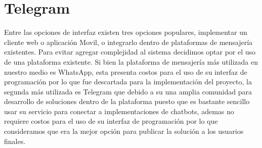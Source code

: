 \section{Telegram}
Entre las opciones de interfaz existen tres opciones populares, implementar un cliente web o
aplicación Movil, o integrarlo dentro de plataformas de mensajería existentes. Para evitar agregar
complejidad al sistema decidimos optar por el uso de una plataforma existente. Si bien la plataforma
de mensajería más utilizada en nuestro medio es WhatsApp, esta presenta
costos para el uso de su interfaz de programación por lo que fue descartada para la implementación del
proyecto, la segunda más utilizada es Telegram que debido a su una amplia comunidad
para desarrollo de soluciones dentro de la plataforma puesto que es bastante sencillo
usar su servicio para conectar a implementaciones de chatbots, ademas no requiere costos para el
uso de su interfaz de programación por lo que consideramos que era la mejor opción para
publicar la solución a los usuarios finales.
\cite{botfather}